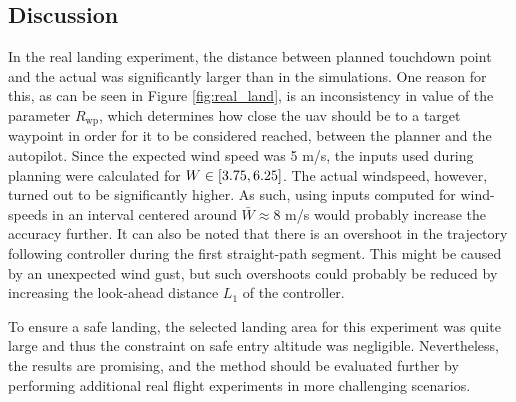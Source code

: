 \subsection{Discussion}
In the real landing experiment, the distance between planned touchdown point and the actual was significantly larger than 
in the simulations. One reason for this, as can be seen in Figure \ref{fig:real_land}, is an inconsistency in value of the parameter $R_{\text{wp}}$, which determines how close the \ac{uav} should be to a target waypoint in 
order for it to be considered reached, between the planner and the autopilot. Since the expected wind speed was 5 m/s, the inputs used during planning were calculated for $W\in[3.75, 6.25]$. The actual windspeed, however, turned out to be significantly higher. 
As such, using inputs computed for wind-speeds in an interval centered around $\bar{W}\approx8$ m/s would probably increase the accuracy further. It can also be noted that there is an overshoot in the trajectory following controller during the first 
straight-path segment. This might be caused by an unexpected wind gust, but such overshoots could probably be reduced by increasing the look-ahead distance $L_1$ of the controller.

To ensure a safe landing, the selected landing area for this experiment was quite large and thus the constraint on safe entry altitude was negligible. 
Nevertheless, the results are promising, and the method should be evaluated further by performing additional real flight experiments in more challenging scenarios.